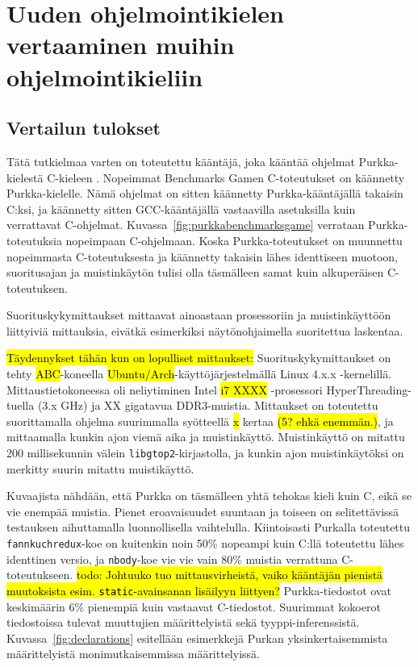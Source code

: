 \section{Uuden ohjelmointikielen vertaaminen muihin ohjelmointikieliin}


\subsection{Vertailun tulokset}
\label{sec:results}

Tätä tutkielmaa varten on toteutettu kääntäjä, joka kääntää ohjelmat
Purkka-kielestä C-kieleen \citep{purkka}. Nopeimmat Benchmarks Gamen
C-toteutukset on käännetty Purkka-kielelle. Nämä ohjelmat on sitten käännetty
Purkka-kääntäjällä takaisin C:ksi, ja käännetty sitten GCC-kääntäjällä
vastaavilla asetuksilla kuin verrattavat C-ohjelmat.
Kuvassa~\ref{fig:purkkabenchmarksgame} verrataan Purkka-toteutuksia nopeimpaan
C-ohjelmaan. Koska Purkka-toteutukset on muunnettu nopeimmasta C-toteutuksesta
ja käännetty takaisin lähes identtiseen muotoon, suoritusajan ja muistinkäytön
tulisi olla täsmälleen samat kuin alkuperäisen C-toteutuksen.

Suorituskykymittaukset mittaavat ainoastaan prosessoriin ja muistinkäyttöön
liittyiviä mittauksia, eivätkä esimerkiksi näytönohjaimella suoritettua
laskentaa.

\hl{Täydennykset tähän kun on lopulliset mittaukset: } Suorituskykymittaukset
on tehty \hl{ABC}-koneella \hl{Ubuntu/Arch}-käyttöjärjestelmällä Linux 4.x.x
-kernelillä. Mittaustietokoneessa oli neliytiminen Intel \hl{i7 XXXX}
-prosessori HyperThreading-tuella (3.x GHz) ja XX gigatavua DDR3-muistia.
Mittaukset on toteutettu suorittamalla ohjelma suurimmalla syötteellä \hl{x}
kertaa \hl{(5? ehkä enemmän.)}, ja mittaamalla kunkin ajon viemä aika ja
muistinkäyttö. Muistinkäyttö on mitattu 200 millisekunnin välein
\texttt{libgtop2}-kirjastolla, ja kunkin ajon muistinkäytöksi on merkitty
suurin mitattu muistikäyttö.

Kuvaajista nähdään, että Purkka on täsmälleen yhtä tehokas kieli kuin C, eikä
se vie enempää muistia. Pienet eroavaisuudet suuntaan ja toiseen on
selitettävissä testauksen aihuttamalla luonnollisella vaihtelulla. Kiintoisasti
Purkalla toteutettu \texttt{fannkuchredux}-koe on kuitenkin noin 50\% nopeampi
kuin C:llä toteutettu lähes identtinen versio, ja \texttt{nbody}-koe vie vie
vain 80\% muistia verrattuna C-toteutukseen. \hl{todo: Johtuuko tuo
mittausvirheistä, vaiko kääntäjän pienistä muutoksista esim.
\texttt{static}-avainsanan lisäilyyn liittyen?} Purkka-tiedostot ovat
keskimäärin 6\% pienempiä kuin vastaavat C-tiedostot. Suurimmat kokoerot
tiedostoissa tulevat muuttujien määrittelyistä sekä tyyppi-inferenssistä.
Kuvassa~\ref{fig:declarations} esitellään esimerkkejä Purkan
yksinkertaisemmista määrittelyistä monimutkaisemmissa määrittelyissä.


